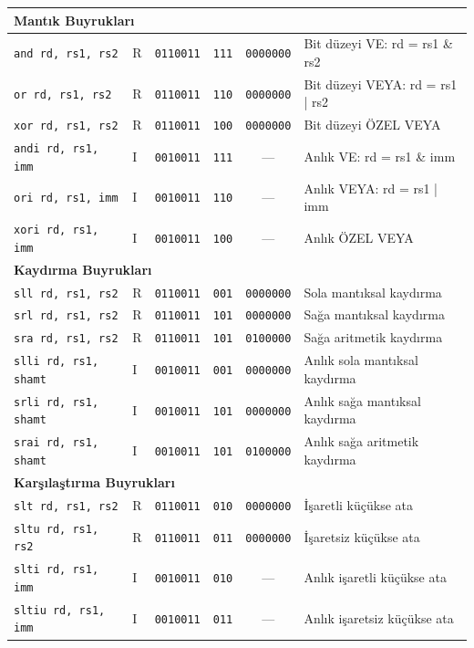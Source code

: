 {\begin{longtable}{@{}l@{\;}l@{\;}c@{\;}c@{\;}c@{\;}l@{}}
\multicolumn{6}{l}{\textbf{Mantık Buyrukları}}\index{mantık buyrukları} \\
\midrule
\texttt{and rd, rs1, rs2}   & R & \texttt{0110011} & \texttt{111} & \texttt{0000000} & Bit düzeyi VE: rd = rs1 \& rs2 \\
\texttt{or rd, rs1, rs2}    & R & \texttt{0110011} & \texttt{110} & \texttt{0000000} & Bit düzeyi VEYA: rd = rs1 | rs2 \\
\texttt{xor rd, rs1, rs2}   & R & \texttt{0110011} & \texttt{100} & \texttt{0000000} & Bit düzeyi ÖZEL VEYA \\
\texttt{andi rd, rs1, imm}  & I & \texttt{0010011} & \texttt{111} & ---          & Anlık VE: rd = rs1 \& imm \\
\texttt{ori rd, rs1, imm}   & I & \texttt{0010011} & \texttt{110} & ---          & Anlık VEYA: rd = rs1 | imm \\
\texttt{xori rd, rs1, imm}  & I & \texttt{0010011} & \texttt{100} & ---          & Anlık ÖZEL VEYA \\
\midrule

\multicolumn{6}{l}{\textbf{Kaydırma Buyrukları}}\index{kaydırma buyrukları} \\
\midrule
\texttt{sll rd, rs1, rs2}   & R & \texttt{0110011} & \texttt{001} & \texttt{0000000} & Sola mantıksal kaydırma \\
\texttt{srl rd, rs1, rs2}   & R & \texttt{0110011} & \texttt{101} & \texttt{0000000} & Sağa mantıksal kaydırma \\
\texttt{sra rd, rs1, rs2}   & R & \texttt{0110011} & \texttt{101} & \texttt{0100000} & Sağa aritmetik kaydırma \\
\texttt{slli rd, rs1, shamt} & I & \texttt{0010011} & \texttt{001} & \texttt{0000000} & Anlık sola mantıksal kaydırma \\
\texttt{srli rd, rs1, shamt} & I & \texttt{0010011} & \texttt{101} & \texttt{0000000} & Anlık sağa mantıksal kaydırma \\
\texttt{srai rd, rs1, shamt} & I & \texttt{0010011} & \texttt{101} & \texttt{0100000} & Anlık sağa aritmetik kaydırma \\
\midrule

\multicolumn{6}{l}{\textbf{Karşılaştırma Buyrukları}}\index{karşılaştırma buyrukları} \\
\midrule
\texttt{slt rd, rs1, rs2}   & R & \texttt{0110011} & \texttt{010} & \texttt{0000000} & İşaretli küçükse ata \\
\texttt{sltu rd, rs1, rs2}  & R & \texttt{0110011} & \texttt{011} & \texttt{0000000} & İşaretsiz küçükse ata \\
\texttt{slti rd, rs1, imm}  & I & \texttt{0010011} & \texttt{010} & ---          & Anlık işaretli küçükse ata \\
\texttt{sltiu rd, rs1, imm} & I & \texttt{0010011} & \texttt{011} & ---          & Anlık işaretsiz küçükse ata \\
\midrule


\end{longtable}}
